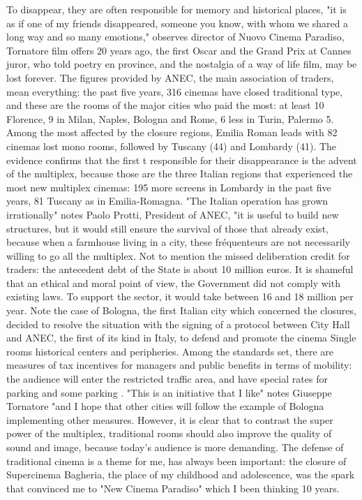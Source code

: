To disappear, they are often responsible for memory and historical places, "it is as if one of my friends disappeared, someone you know, with whom we shared a long way and so many emotions," observes director of Nuovo Cinema Paradiso, Tornatore film offers 20 years ago, the first Oscar and the Grand Prix at Cannes juror, who told poetry en province, and the nostalgia of a way of life film, may be lost forever.
The figures provided by ANEC, the main association of traders, mean everything: the past five years, 316 cinemas have closed traditional type, and these are the rooms of the major cities who paid the most: at least 10 Florence, 9 in Milan, Naples, Bologna and Rome, 6 less in Turin, Palermo 5.
Among the most affected by the closure regions, Emilia Roman leads with 82 cinemas lost mono rooms, followed by Tuscany (44) and Lombardy (41).
The evidence confirms that the first t responsible for their disappearance is the advent of the multiplex, because those are the three Italian regions that experienced the most new multiplex cinemas: 195 more screens in Lombardy in the past five years, 81 Tuscany as in Emilia-Romagna.
"The Italian operation has grown irrationally" notes Paolo Protti, President of ANEC, "it is useful to build new structures, but it would still ensure the survival of those that already exist, because when a farmhouse living in a city, these fréquenteurs are not necessarily willing to go all the multiplex.
Not to mention the missed deliberation credit for traders: the antecedent debt of the State is about 10 million euros.
It is shameful that an ethical and moral point of view, the Government did not comply with existing laws.
To support the sector, it would take between 16 and 18 million per year.
Note the case of Bologna, the first Italian city which concerned the closures, decided to resolve the situation with the signing of a protocol between City Hall and ANEC, the first of its kind in Italy, to defend and promote the cinema Single rooms historical centers and peripheries.
Among the standards set, there are measures of tax incentives for managers and public benefits in terms of mobility: the audience will enter the restricted traffic area, and have special rates for parking and some parking .
"This is an initiative that I like" notes Giuseppe Tornatore "and I hope that other cities will follow the example of Bologna implementing other measures.
However, it is clear that to contrast the super power of the multiplex, traditional rooms should also improve the quality of sound and image, because today's audience is more demanding.
The defense of traditional cinema is a theme for me, has always been important: the closure of Supercinema Bagheria, the place of my childhood and adolescence, was the spark that convinced me to "New Cinema Paradiso" which I been thinking 10 years.
